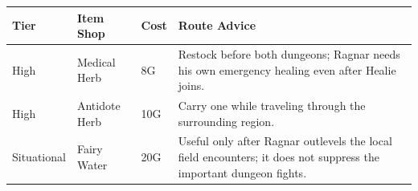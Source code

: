 \documentclass[
  american,
  10pt,
  letterpaper,
  oneside,
  open=any]{scrreprt}
\newcounter{none} %
\newenvironment{guidetable}{%
  \small\setstretch{1.0}%
  \setlength{\tabcolsep}{4pt}%
  \setlength{\LTpre}{8pt}\setlength{\LTpost}{10pt}%
  \renewcommand{\arraystretch}{1.16}%
}{ }
\begin{document}
\begin{guidetable}

{\def\LTcaptype{none} %
\begin{longtable}[]{@{}
  >{\raggedright\arraybackslash}p{}
  >{\raggedright\arraybackslash}p{}
  >{\raggedleft\arraybackslash}p{}
  >{\raggedright\arraybackslash}p{}@{}}
\toprule\noalign{}
\begin{minipage}[b]{\linewidth}\raggedright
\color{GuideGreen}\bfseries Tier
\end{minipage} & \begin{minipage}[b]{\linewidth}\raggedright
\color{GuideGreen}\bfseries Item Shop
\end{minipage} & \begin{minipage}[b]{\linewidth}\raggedleft
\color{GuideGreen}\bfseries Cost
\end{minipage} & \begin{minipage}[b]{\linewidth}\raggedright
\color{GuideGreen}\bfseries Route Advice
\end{minipage} \\
\midrule\noalign{}
\endhead
\bottomrule\noalign{}
\endlastfoot
High & Medical Herb & 8G & Restock before both dungeons; Ragnar needs
his own emergency healing even after Healie joins. \\
High & Antidote Herb & 10G & Carry one while traveling through the
surrounding region. \\
Situational & Fairy Water & 20G & Useful only after Ragnar outlevels the
local field encounters; it does not suppress the important dungeon
fights. \\
\end{longtable}
}

\end{guidetable}
\end{document}
